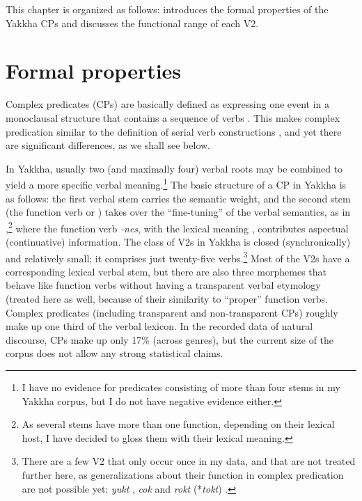 This chapter is organized as follows:   introduces the formal properties of the Yakkha CPs and  discusses the functional range of each V2.

\section{Formal properties}\label{verb-verb-formal}
 
Complex predicates (CPs) are basically defined as expressing one event in a monoclausal structure that contains a sequence of verbs \citep{Givon1991Some-substantive}. This makes complex predication similar to the definition of serial verb constructions \citep{Aikhenvald2006_Serial, Durie1997_Grammatical}, and yet there are significant differences, as we shall see below. 
 
In Yakkha, usually two (and maximally four) verbal roots may be combined to yield a more specific verbal meaning.\footnote{I have no evidence for predicates consisting of more than four stems in my Yakkha corpus, but I do not have negative evidence either.} The basic structure of a CP in Yakkha is as follows: the first verbal stem carries the semantic weight, and the second stem (the function verb or ) takes over the “fine-tuning” of the verbal semantics,  as in \Next,\footnote{As several stems have more than one function, depending on their lexical host, I have decided to gloss them with their lexical meaning.} where the function verb \emph{-nes}, with the lexical meaning , contributes aspectual (continuative) information. The class of V2s in Yakkha is closed (synchronically) and relatively small; it comprises just twenty-five verbs.\footnote{There are a few V2 that only occur once in my data, and that are not treated further here, as generalizations about their function in complex predication are not possible yet: \emph{yukt} , \emph{cok}  and \emph{rokt} (*\emph{tokt}) .} Most of the V2s have a corresponding lexical verbal stem, but there are also three morphemes that behave like function verbs without having a transparent verbal etymology (treated here as well, because of their similarity to “proper” function verbs. Complex predicates (including transparent and non-transparent CPs) roughly make up one third of the verbal lexicon. In the recorded  data of natural discourse, CPs make up only 17\% (across genres), but the current size of the corpus does not allow any strong statistical claims.



